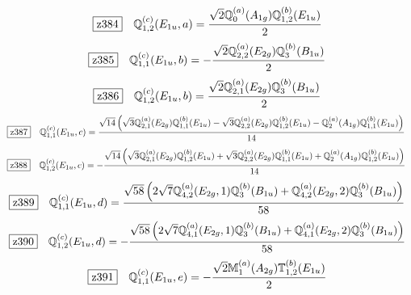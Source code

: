 \documentclass[fleqn,10pt,landscape]{jsarticle}
\begin{document}
\begin{dmath*}
\hspace*{3mm}\fbox{z384}\quad \mathbb{Q}_{1,2}^{(c)}(E_{1u},a)=\frac{\sqrt{2} \mathbb{Q}_{0}^{(a)}(A_{1g}) \mathbb{Q}_{1,2}^{(b)}(E_{1u})}{2}
\end{dmath*}
\begin{dmath*}
\hspace*{3mm}\fbox{z385}\quad \mathbb{Q}_{1,1}^{(c)}(E_{1u},b)=- \frac{\sqrt{2} \mathbb{Q}_{2,2}^{(a)}(E_{2g}) \mathbb{Q}_{3}^{(b)}(B_{1u})}{2}
\end{dmath*}
\begin{dmath*}
\hspace*{3mm}\fbox{z386}\quad \mathbb{Q}_{1,2}^{(c)}(E_{1u},b)=\frac{\sqrt{2} \mathbb{Q}_{2,1}^{(a)}(E_{2g}) \mathbb{Q}_{3}^{(b)}(B_{1u})}{2}
\end{dmath*}
\begin{dmath*}
\hspace*{3mm}\fbox{z387}\quad \mathbb{Q}_{1,1}^{(c)}(E_{1u},c)=\frac{\sqrt{14} \left(\sqrt{3} \mathbb{Q}_{2,1}^{(a)}(E_{2g}) \mathbb{Q}_{1,1}^{(b)}(E_{1u}) - \sqrt{3} \mathbb{Q}_{2,2}^{(a)}(E_{2g}) \mathbb{Q}_{1,2}^{(b)}(E_{1u}) - \mathbb{Q}_{2}^{(a)}(A_{1g}) \mathbb{Q}_{1,1}^{(b)}(E_{1u})\right)}{14}
\end{dmath*}
\begin{dmath*}
\hspace*{3mm}\fbox{z388}\quad \mathbb{Q}_{1,2}^{(c)}(E_{1u},c)=- \frac{\sqrt{14} \left(\sqrt{3} \mathbb{Q}_{2,1}^{(a)}(E_{2g}) \mathbb{Q}_{1,2}^{(b)}(E_{1u}) + \sqrt{3} \mathbb{Q}_{2,2}^{(a)}(E_{2g}) \mathbb{Q}_{1,1}^{(b)}(E_{1u}) + \mathbb{Q}_{2}^{(a)}(A_{1g}) \mathbb{Q}_{1,2}^{(b)}(E_{1u})\right)}{14}
\end{dmath*}
\begin{dmath*}
\hspace*{3mm}\fbox{z389}\quad \mathbb{Q}_{1,1}^{(c)}(E_{1u},d)=\frac{\sqrt{58} \left(2 \sqrt{7} \mathbb{Q}_{4,2}^{(a)}(E_{2g},1) \mathbb{Q}_{3}^{(b)}(B_{1u}) + \mathbb{Q}_{4,2}^{(a)}(E_{2g},2) \mathbb{Q}_{3}^{(b)}(B_{1u})\right)}{58}
\end{dmath*}
\begin{dmath*}
\hspace*{3mm}\fbox{z390}\quad \mathbb{Q}_{1,2}^{(c)}(E_{1u},d)=- \frac{\sqrt{58} \left(2 \sqrt{7} \mathbb{Q}_{4,1}^{(a)}(E_{2g},1) \mathbb{Q}_{3}^{(b)}(B_{1u}) + \mathbb{Q}_{4,1}^{(a)}(E_{2g},2) \mathbb{Q}_{3}^{(b)}(B_{1u})\right)}{58}
\end{dmath*}
\begin{dmath*}
\hspace*{3mm}\fbox{z391}\quad \mathbb{Q}_{1,1}^{(c)}(E_{1u},e)=- \frac{\sqrt{2} \mathbb{M}_{1}^{(a)}(A_{2g}) \mathbb{T}_{1,2}^{(b)}(E_{1u})}{2}
\end{dmath*}
\end{document}
